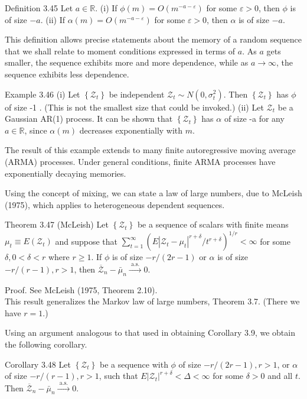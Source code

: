 \documentclass[10pt]{article}
\begin{document}
Definition 3.45 Let $a \in \mathbb{R}$. (i) If $\phi(m)=O\left(m^{-a-\varepsilon}\right)$ for some $\varepsilon>0$, then $\phi$ is of size $-a$. (ii) If $\alpha(m)=O\left(m^{-a-\varepsilon}\right)$ for some $\varepsilon>0$, then $\alpha$ is of size $-a$.

This definition allows precise statements about the memory of a random sequence that we shall relate to moment conditions expressed in terms of $a$. As $a$ gets smaller, the sequence exhibits more and more dependence, while as $a \rightarrow \infty$, the sequence exhibits less dependence.

Example 3.46 (i) Let $\left\{\mathcal{Z}_{t}\right\}$ be independent $\mathcal{Z}_{t} \sim N\left(0, \sigma_{t}^{2}\right)$. Then $\left\{\mathcal{Z}_{t}\right\}$ has $\phi$ of size -1 . (This is not the smallest size that could be invoked.) (ii) Let $\mathcal{Z}_{t}$ be a Gaussian AR(1) process. It can be shown that $\left\{\mathcal{Z}_{t}\right\}$ has $\alpha$ of size -a for any $a \in \mathbb{R}$, since $\alpha(m)$ decreases exponentially with $m$.

The result of this example extends to many finite autoregressive moving average (ARMA) processes. Under general conditions, finite ARMA processes have exponentially decaying memories.

Using the concept of mixing, we can state a law of large numbers, due to McLeish (1975), which applies to heterogeneous dependent sequences.

Theorem 3.47 (McLeish) Let $\left\{\mathcal{Z}_{t}\right\}$ be a sequence of scalars with finite means $\mu_{t} \equiv E\left(\mathcal{Z}_{t}\right)$ and suppose that $\sum_{t=1}^{\infty}\left(E\left|\mathcal{Z}_{t}-\mu_{t}\right|^{r+\delta} / t^{r+\delta}\right)^{1 / r}<\infty$ for some $\delta, 0<\delta<r$ where $r \geq 1$. If $\phi$ is of size $-r /(2 r-1)$ or $\alpha$ is of size $-r /(r-1), r>1$, then $\overline{\mathcal{Z}}_{n}-\bar{\mu}_{n} \xrightarrow{\text { a.s. }} 0$.

Proof. See McLeish (1975, Theorem 2.10).\\
This result generalizes the Markov law of large numbers, Theorem 3.7. (There we have $r=1$.)

Using an argument analogous to that used in obtaining Corollary 3.9, we obtain the following corollary.

Corollary 3.48 Let $\left\{\mathcal{Z}_{t}\right\}$ be a sequence with $\phi$ of size $-r /(2 r-1), r>1$, or $\alpha$ of size $-r /(r-1), r>1$, such that $E\left|\mathcal{Z}_{t}\right|^{r+\delta}<\Delta<\infty$ for some $\delta>0$ and all $t$. Then $\overline{\mathcal{Z}}_{n}-\bar{\mu}_{n} \xrightarrow{\text { a.s. }} 0$.
\end{document}
